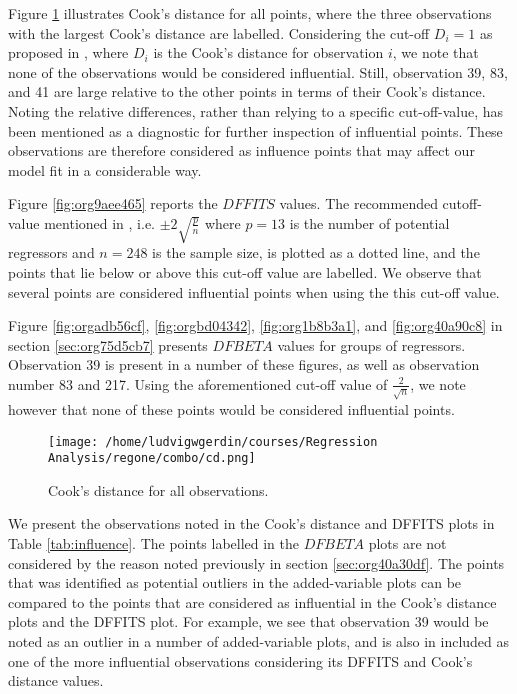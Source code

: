 \documentclass[11pt]{article}
\begin{document}


Figure \ref{fig:org9034a00} illustrates Cook's distance for all points, where the three observations with the largest 
Cook's distance are labelled. Considering the cut-off \(D_i = 1\) as proposed in \cite{Montgomery2012}, 
where \(D_i\) is the Cook's distance for observation \(i\), we note that none of the observations would be 
considered influential. Still, observation 39, 83, and 41 are large relative
to the other points in terms of their Cook's distance. Noting the relative differences, rather 
than relying to a specific cut-off-value, has been mentioned as a diagnostic for further
inspection of influential points. \cite{Fox1991} These observations are therefore considered as influence
points that may affect our model fit in a considerable way.

Figure \ref{fig:org9aee465} reports the \(DFFITS\) values. 
The recommended cutoff-value mentioned in \cite{Montgomery2012}, i.e. \(\pm 2\sqrt{\frac{p}{n}}\)
where \(p = 13\) is the number of potential regressors and \(n = 248\) is the sample size, is 
plotted as a dotted line, and the points that lie below or above this cut-off value are labelled.
We observe that several points are considered influential points when using the this cut-off value.

Figure \ref{fig:orgadb56cf}, \ref{fig:orgbd04342}, \ref{fig:org1b8b3a1}, and
\ref{fig:org40a90c8} in section \ref{sec:org75d5cb7} presents \(DFBETA\) values for groups of regressors. 
Observation 39 is present in a number of these figures, as well as observation number 83 and 217. 
Using the aforementioned cut-off value of \(\frac{2}{\sqrt{n}}\), we note however that none of these points
would be considered influential points.

\begin{figure}[H]
\centering
\texttt{[image: /home/ludvigwgerdin/courses/Regression Analysis/regone/combo/cd.png]}
\caption{\label{fig:org9034a00}
Cook's distance for all observations.}
\end{figure}

We present the observations noted in the Cook's distance and DFFITS plots in Table \ref{tab:influence}.
The points labelled in the \(DFBETA\) plots are not considered by the reason noted previously 
in section \ref{sec:org40a30df}. The points that was identified as potential outliers in the added-variable
plots can be compared to the points that are considered as influential in the Cook's distance plots
and the DFFITS plot. For example, we see that observation 39 would be noted as an outlier in a number of 
added-variable plots, and is also in included as one of the more influential observations considering 
its DFFITS and Cook's distance values.
\end{document}
